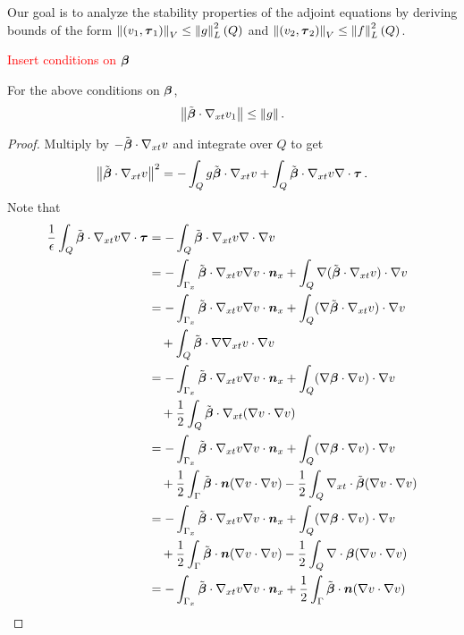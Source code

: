 \documentclass{article}
\begin{document}
Our goal is to analyze the stability properties of the adjoint equations by deriving bounds of the form
$\left\| (v_1,\boldsymbol\tau_1) \right\|_V\leq\left\| g \right\|_L^2\left( Q \right)$ and $\left\| (v_2,\boldsymbol\tau_2) \right\|_V\leq\left\| f \right\|_L^2\left( Q \right)$.

\textcolor{red}{Insert conditions on $\boldsymbol\beta$}
\begin{lemma}
\label{lem:convective}
For the above conditions on $\boldsymbol\beta$,
\[
\left\| \tilde{\boldsymbol\beta}\cdot\nabla_{xt} v_1 \right\|\leq \left\| g \right\|.
\]
\end{lemma}
\begin{proof}
Multiply by $-\tilde{\boldsymbol\beta}\cdot\nabla_{xt} v$ and integrate over $Q$ to get
\begin{equation}
\label{eq:adj1}
\left\| \tilde{\boldsymbol\beta}\cdot\nabla_{xt} v \right\|^2=-\int_Q g\tilde{\boldsymbol\beta}\cdot\nabla_{xt} v+\int_Q\tilde{\boldsymbol\beta}\cdot\nabla_{xt} v\nabla\cdot\boldsymbol\tau\,.
\end{equation}
Note that
\begin{align*}
\frac{1}{\epsilon}\int_Q\tilde\bfbeta\cdot\Gradxt v\Div\bftau&=-\int_Q\tilde\bfbeta\cdot\Gradxt v\Div\Grad v \\
%
&=-\int_{\Gamma_x}\tilde\bfbeta\cdot\Gradxt v\Grad v\cdot\bfn_x
+\int_Q\Grad(\tilde\bfbeta\cdot\Gradxt v)\cdot\Grad v \\
%
&=-\int_{\Gamma_x}\tilde\bfbeta\cdot\Gradxt v\Grad v\cdot\bfn_x
+\int_Q(\Grad\tilde\bfbeta\cdot\Gradxt v)\cdot\Grad v\\
&\quad+\int_Q\tilde\bfbeta\cdot\Grad\Gradxt v\cdot\Grad v\\
%
&=-\int_{\Gamma_x}\tilde\bfbeta\cdot\Gradxt v\Grad v\cdot\bfn_x
+\int_Q(\Grad\bfbeta\cdot\Grad v)\cdot\Grad v\\
&\quad+\frac{1}{2}\int_Q\tilde\bfbeta\cdot\Gradxt(\Grad v\cdot\Grad v)\\
%
&=-\int_{\Gamma_x}\tilde\bfbeta\cdot\Gradxt v\Grad v\cdot\bfn_x
+\int_Q(\Grad\bfbeta\cdot\Grad v)\cdot\Grad v\\
&\quad+\frac{1}{2}\int_\Gamma\tilde\bfbeta\cdot\bfn(\Grad v\cdot\Grad v)
-\frac{1}{2}\int_Q\Divxt\tilde\bfbeta(\Grad v\cdot\Grad v)\\
%
&=-\int_{\Gamma_x}\tilde\bfbeta\cdot\Gradxt v\Grad v\cdot\bfn_x
+\int_Q(\Grad\bfbeta\cdot\Grad v)\cdot\Grad v\\
&\quad+\frac{1}{2}\int_\Gamma\tilde\bfbeta\cdot\bfn(\Grad v\cdot\Grad v)
-\frac{1}{2}\int_Q\Div\bfbeta(\Grad v\cdot\Grad v)\\
%
&=-\int_{\Gamma_x}\tilde\bfbeta\cdot\Gradxt v\Grad v\cdot\bfn_x
+\frac{1}{2}\int_\Gamma\tilde\bfbeta\cdot\bfn(\Grad v\cdot\Grad v)\\

\end{align*}
\end{proof}
\end{document}
